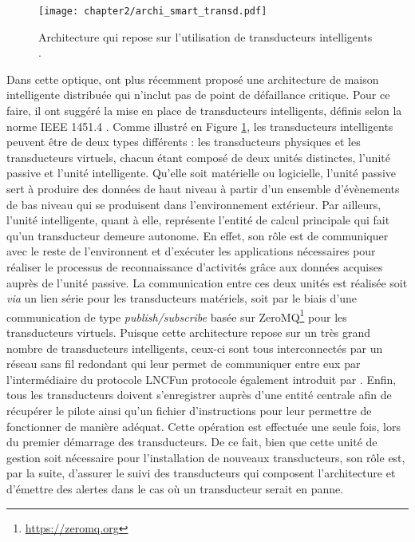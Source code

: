 \begin{figure}[H]
	\centering
	\texttt{[image: chapter2/archi\_smart\_transd.pdf]}
	\caption[Architecture qui repose sur l'utilisation de transducteurs intelligents.]{Architecture qui repose sur l'utilisation de transducteurs intelligents \citep{Plantevin2018}.}
	\label{fig:archi_smart_transd}
\end{figure}

Dans cette optique, \cite{Plantevin2018} ont plus récemment proposé une architecture de maison intelligente distribuée qui n'inclut pas de point de défaillance critique. Pour ce faire, il ont suggéré la mise en place de transducteurs intelligents, définis selon la norme IEEE 1451.4 \citep{InstituteofElectricalandElectronicsEngineers1999}. Comme illustré en Figure \ref{fig:archi_smart_transd}, les transducteurs intelligents peuvent être de deux types différents : les transducteurs physiques et les transducteurs virtuels, chacun étant composé de deux unités distinctes, l'unité passive et l'unité intelligente. Qu'elle soit matérielle ou logicielle, l'unité passive sert à produire des données de haut niveau à partir d'un ensemble d'évènements de bas niveau qui se produisent dans l'environnement extérieur. Par ailleurs, l'unité intelligente, quant à elle, représente l'entité de calcul principale qui fait qu'un transducteur demeure autonome. En effet, son rôle est de communiquer avec le reste de l'environnent et d'exécuter les applications nécessaires pour réaliser le processus de reconnaissance d'activités grâce aux données acquises auprès de l'unité passive. La communication entre ces deux unités est réalisée soit \textit{via} un lien série pour les transducteurs matériels, soit par le biais d'une communication de type \textit{publish/subscribe} basée sur ZeroMQ\footnote{\url{https://zeromq.org}} pour les transducteurs virtuels. Puisque cette architecture repose sur un très grand nombre de transducteurs intelligents, ceux-ci sont tous interconnectés par un réseau sans fil redondant qui leur permet de communiquer entre eux par l'intermédiaire du protocole \ac{LNCF}\textemdash un protocole également introduit par \cite{Plantevin2017}. Enfin, tous les transducteurs doivent s'enregistrer auprès d'une entité centrale afin de récupérer le pilote ainsi qu'un fichier d'instructions pour leur permettre de fonctionner de manière adéquat. Cette opération est effectuée une seule fois, lors du premier démarrage des transducteurs. De ce fait, bien que cette unité de gestion soit nécessaire pour l'installation de nouveaux transducteurs, son rôle est, par la suite, d'assurer le suivi des transducteurs qui composent l'architecture et d'émettre des alertes dans le cas où un transducteur serait en panne.


